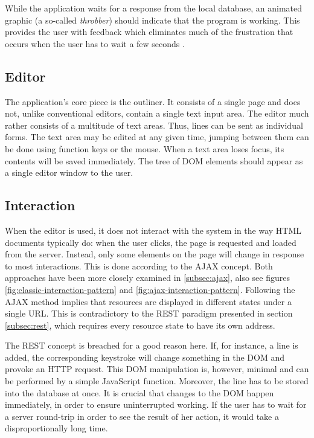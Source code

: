 While the application waits for a response from the local database, an animated graphic (a so-called \textit{throbber}) should indicate that the program is working. This provides the user with feedback which eliminates much of the frustration that occurs when the user has to wait a few seconds .


\subsection{Editor}

The application's core piece is the outliner. It consists of a single page and does not, unlike conventional editors, contain a single text input area. The editor much rather consists of a multitude of text areas. Thus, lines can be sent as individual forms. The text area may be edited at any given time, jumping between them can be done using function keys or the mouse. When a text area loses focus, its contents will be saved immediately. The tree of DOM elements should appear as a single editor window to the user.


\subsection{Interaction}

When the editor is used, it does not interact with the system in the way HTML documents typically do: when the user clicks, the page is requested and loaded from the server. Instead, only some elements on the page will change in response to most interactions. This is done according to the AJAX concept. Both approaches have been more closely examined in \ref{subsec:ajax}, also see figures \ref{fig:classic-interaction-pattern} and \ref{fig:ajax-interaction-pattern}. Following the AJAX method implies that resources are displayed in different states under a single URL. This is contradictory to the REST paradigm presented in section \ref{subsec:rest}, which requires every resource state to have its own address.

The REST concept is breached for a good reason here. If, for instance, a line is added, the corresponding keystroke will change something in the DOM and provoke an HTTP request. This DOM manipulation is, however, minimal and can be performed by a simple JavaScript function. Moreover, the line has to be stored into the database at once. It is crucial that changes to the DOM happen immediately, in order to ensure uninterrupted working. If the user has to wait for a server round-trip in order to see the result of her action, it would take a disproportionally long time.